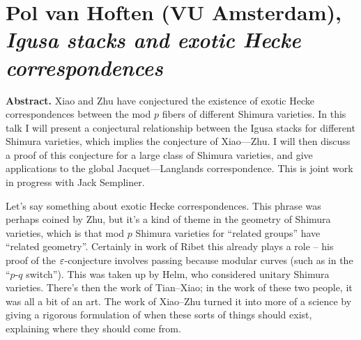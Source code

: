 \documentclass[reqno]{amsart} 
\begin{document}
\part{Pol van Hoften (VU Amsterdam), \emph{Igusa stacks and exotic Hecke correspondences}}

\textbf{Abstract.}  Xiao and Zhu have conjectured the existence of exotic Hecke correspondences between the mod $p$ fibers of different Shimura varieties. In this talk I will present a conjectural relationship between the Igusa stacks for different Shimura varieties, which implies the conjecture of Xiao—Zhu. I will then discuss a proof of this conjecture for a large class of Shimura varieties, and give applications to the global Jacquet—Langlands correspondence. This is joint work in progress with Jack Sempliner.


Let's say something about exotic Hecke correspondences.  This phrase was perhaps coined by Zhu, but it's a kind of theme in the geometry of Shimura varieties, which is that mod $p$ Shimura varieties for ``related groups'' have ``related geometry''.  Certainly in work of Ribet this already plays a role -- his proof of the $\varepsilon$-conjecture involves passing because modular curves (such as in the ``$p$-$q$ switch'').  This was taken up by Helm, who considered unitary Shimura varieties.  There's then the work of Tian--Xiao; in the work of these two people, it was all a bit of an art.  The work of Xiao--Zhu turned it into more of a science by giving a rigorous formulation of when these sorts of things should exist, explaining where they should come from.
\end{document}
